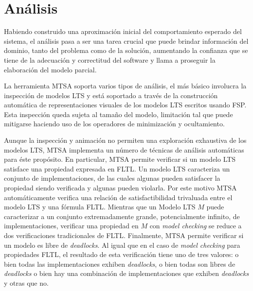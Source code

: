 \section{Análisis}

Habiendo construido una aproximación inicial del comportamiento esperado del sistema, el análisis pasa a ser una tarea
crucial que puede brindar información del dominio, tanto del problema como de la solución, aumentando la confianza que se
tiene de la adecuación y correctitud del software y llama a proseguir la elaboración del modelo parcial. 

La herramienta MTSA soporta varios tipos de análisis, el más básico involucra la inspección de modelos LTS y está
soportado a través de la construcción automática de representaciones visuales de los modelos LTS escritos usando FSP.
Esta inspección queda sujeta al tamaño del modelo, limitación tal que puede mitigarse haciendo uso de los operadores de
minimización y ocultamiento.

Aunque la inspección y animación no permiten una exploración exhaustiva de los modelos LTS, MTSA implementa un número de
técnicas de análisis automáticas para éste propósito. En particular, MTSA permite verificar si un modelo LTS satisface
una propiedad expresada en FLTL. Un modelo LTS caracteriza un conjunto de implementaciones, de las cuales algunas pueden
satisfacer la propiedad siendo verificada y algunas pueden violarla. Por este motivo MTSA automáticamente verifica una
relación de satisfactibilidad trivaluada entre el modelo LTS y una fórmula FLTL. Mientras que un Modelo LTS $M$ puede
caracterizar a un conjunto extremadamente grande, potencialmente infinito, de implementaciones, verificar una propiedad
en $M$ con \emph{model checking} se reduce a dos verificaciones tradicionales de FLTL. Finalmente, MTSA permite verificar si un
modelo es libre de \emph{deadlocks}. Al igual que en el caso de \emph{model checking} para propiedades FLTL, el
resultado de esta verificación tiene uno de tres valores: o bien todas las implementaciones exhiben \emph{deadlocks}, o
bien todas son libres de \emph{deadlocks} o bien hay una combinación de implementaciones que exhiben \emph{deadlocks} y
otras que no.
